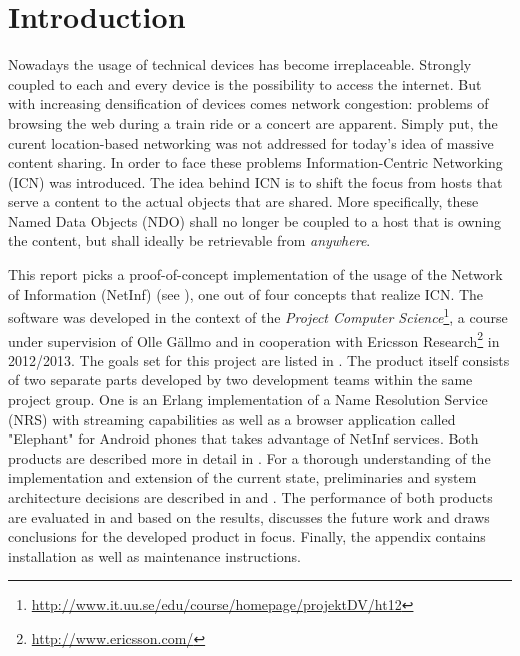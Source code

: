 \chapter{Introduction}

Nowadays the usage of technical devices has become irreplaceable. Strongly coupled to
each and every device is the possibility to access the internet. But with increasing
densification of devices comes network congestion: problems of
browsing the web during a train ride or a concert are apparent. Simply put, the curent
location-based networking was not addressed for today's idea of massive content sharing. 
In order to face these problems Information-Centric Networking (ICN) was introduced.
The idea behind ICN is to shift the focus from hosts that serve a content to the actual objects that
are shared. More specifically, these Named Data Objects (NDO) shall no longer be coupled
to a host that is owning the content, but shall ideally be retrievable from \textit{anywhere}.

This report picks a proof-of-concept implementation of the usage of the Network of Information (NetInf) 
(see ), one out of four concepts that realize ICN. The software was
developed in the context of the 
\textit{Project Computer Science}\footnote{\url{http://www.it.uu.se/edu/course/homepage/projektDV/ht12}},
a course under supervision of Olle G\"{a}llmo and in cooperation with Ericsson Research\footnote{\url{http://www.ericsson.com/}}
in 2012/2013. The goals set for this project are listed in . 
The product itself consists of two separate parts developed by two development teams within the same project group. One is an Erlang implementation of a Name Resolution Service (NRS) with streaming capabilities
as well as a browser application called "Elephant" for Android phones that takes advantage of NetInf services. 
Both products are described more in detail in . For a thorough understanding
of the implementation and extension of the current state, preliminaries and system architecture decisions are 
described in  and . 
The performance of both products are evaluated in  and based on the results,
 discusses the future work and draws conclusions for the developed product
in focus. Finally, the appendix contains installation as well as maintenance instructions.
